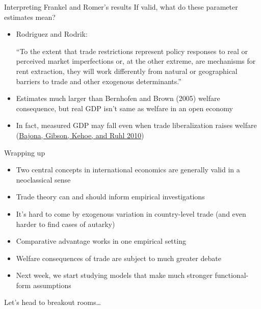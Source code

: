 \documentclass[10pt,notes=hide]{beamer}
\begin{document}
\begin{frame}{Interpreting Frankel and Romer's results}
If valid, what do these parameter estimates mean?
\begin{itemize}
	\item Rodriguez and Rodrik: {``To the extent that trade restrictions represent policy responses to real or perceived market imperfections or, at the other extreme, are mechanisms for rent extraction, they will work differently from natural or geographical barriers to trade and other exogenous determinants.''\par}
	\item Estimates much larger than Bernhofen and Brown (2005) welfare consequence, but real GDP isn't same as welfare in an open economy
	\item In fact, measured GDP may fall even when trade liberalization raises welfare (\href{http://users.econ.umn.edu/~tkehoe/papers/BajonaGibsonKehoeRuhl.pdf}{Bajona, Gibson, Kehoe, and Ruhl 2010})
\end{itemize}
\end{frame}
\begin{frame}{Wrapping up}
\begin{itemize}
	\item Two central concepts in international economics are generally valid in a neoclassical sense
	\item Trade theory can and should inform empirical investigations
	\item It's hard to come by exogenous variation in country-level trade (and even harder to find cases of autarky)
	\item Comparative advantage works in one empirical setting
	\item Welfare consequences of trade are subject to much greater debate
	\item Next week, we start studying models that make much stronger functional-form assumptions
\end{itemize}
Let's head to breakout rooms\dots
\end{frame}
\end{document}
